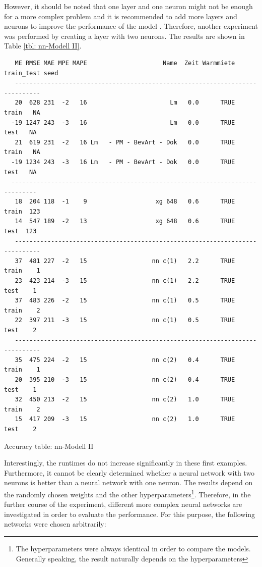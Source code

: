 However, it should be noted that one layer and one neuron might not be enough for a more complex problem and it is recommended to add more layers and neurons to improve the performance of the model \cite{Deep Learning Goodfellow}. Therefore, another experiment was performed by creating a layer with two neurons. The results are shown in Table \ref{tbl: nn-Modell II}.

\begin{table}[H]
	\begin{verbatim}
   ME RMSE MAE MPE MAPE                     Name  Zeit Warmmiete train_test seed
   -----------------------------------------------------------------------------
   20  628 231  -2   16                       Lm   0.0      TRUE      train   NA
  -19 1247 243  -3   16                       Lm   0.0      TRUE       test   NA
   21  619 231  -2   16 Lm   - PM - BevArt - Dok   0.0      TRUE      train   NA
  -19 1234 243  -3   16 Lm   - PM - BevArt - Dok   0.0      TRUE       test   NA
  -----------------------------------------------------------------------------
   18  204 118  -1    9                   xg 648   0.6      TRUE      train  123
   14  547 189  -2   13                   xg 648   0.6      TRUE       test  123
   -----------------------------------------------------------------------------
   37  481 227  -2   15                  nn c(1)   2.2      TRUE      train    1
   23  423 214  -3   15                  nn c(1)   2.2      TRUE       test    1
   37  483 226  -2   15                  nn c(1)   0.5      TRUE      train    2
   22  397 211  -3   15                  nn c(1)   0.5      TRUE       test    2
   -----------------------------------------------------------------------------
   35  475 224  -2   15                  nn c(2)   0.4      TRUE      train    1
   20  395 210  -3   15                  nn c(2)   0.4      TRUE       test    1
   32  450 213  -2   15                  nn c(2)   1.0      TRUE      train    2
   15  417 209  -3   15                  nn c(2)   1.0      TRUE       test    2 	
	\end{verbatim}
	\caption{Accuracy table: nn-Modell II}
	\label{tbl: nn-Modell II}
\end{table}

Interestingly, the runtimes do not increase significantly in these first examples. Furthermore, it cannot be clearly determined whether a neural network with two neurons is better than a neural network with one neuron. The results depend on the randomly chosen weights and the other hyperparameters\footnote{The hyperparameters were always identical in order to compare the models. Generally speaking, the result naturally depends on the hyperparameters}. Therefore, in the further course of the experiment, different more complex neural networks are investigated in order to evaluate the performance. For this purpose, the following networks were chosen arbitrarily:

